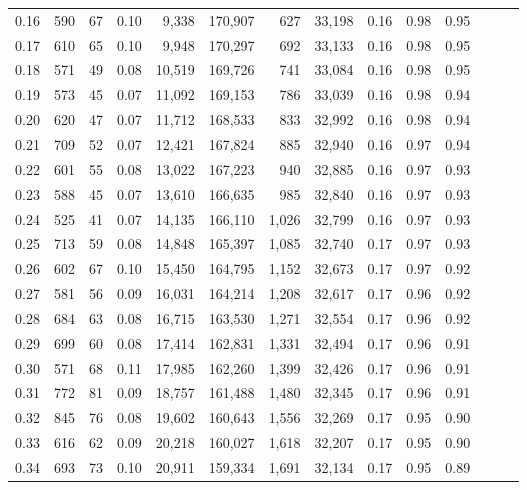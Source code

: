 \begin{tabular}{rrrrrrrrrrrrrr}
0.16 &    590 &     67 &  0.10 &    9,338 &  170,907 &     627 &  33,198 &  0.16 &  0.98 &      0.95 \\
0.17 &    610 &     65 &  0.10 &    9,948 &  170,297 &     692 &  33,133 &  0.16 &  0.98 &      0.95 \\
0.18 &    571 &     49 &  0.08 &   10,519 &  169,726 &     741 &  33,084 &  0.16 &  0.98 &      0.95 \\
0.19 &    573 &     45 &  0.07 &   11,092 &  169,153 &     786 &  33,039 &  0.16 &  0.98 &      0.94 \\
0.20 &    620 &     47 &  0.07 &   11,712 &  168,533 &     833 &  32,992 &  0.16 &  0.98 &      0.94 \\
0.21 &    709 &     52 &  0.07 &   12,421 &  167,824 &     885 &  32,940 &  0.16 &  0.97 &      0.94 \\
0.22 &    601 &     55 &  0.08 &   13,022 &  167,223 &     940 &  32,885 &  0.16 &  0.97 &      0.93 \\
0.23 &    588 &     45 &  0.07 &   13,610 &  166,635 &     985 &  32,840 &  0.16 &  0.97 &      0.93 \\
0.24 &    525 &     41 &  0.07 &   14,135 &  166,110 &   1,026 &  32,799 &  0.16 &  0.97 &      0.93 \\
0.25 &    713 &     59 &  0.08 &   14,848 &  165,397 &   1,085 &  32,740 &  0.17 &  0.97 &      0.93 \\
0.26 &    602 &     67 &  0.10 &   15,450 &  164,795 &   1,152 &  32,673 &  0.17 &  0.97 &      0.92 \\
0.27 &    581 &     56 &  0.09 &   16,031 &  164,214 &   1,208 &  32,617 &  0.17 &  0.96 &      0.92 \\
0.28 &    684 &     63 &  0.08 &   16,715 &  163,530 &   1,271 &  32,554 &  0.17 &  0.96 &      0.92 \\
0.29 &    699 &     60 &  0.08 &   17,414 &  162,831 &   1,331 &  32,494 &  0.17 &  0.96 &      0.91 \\
0.30 &    571 &     68 &  0.11 &   17,985 &  162,260 &   1,399 &  32,426 &  0.17 &  0.96 &      0.91 \\
0.31 &    772 &     81 &  0.09 &   18,757 &  161,488 &   1,480 &  32,345 &  0.17 &  0.96 &      0.91 \\
0.32 &    845 &     76 &  0.08 &   19,602 &  160,643 &   1,556 &  32,269 &  0.17 &  0.95 &      0.90 \\
0.33 &    616 &     62 &  0.09 &   20,218 &  160,027 &   1,618 &  32,207 &  0.17 &  0.95 &      0.90 \\
0.34 &    693 &     73 &  0.10 &   20,911 &  159,334 &   1,691 &  32,134 &  0.17 &  0.95 &      0.89 \\

\end{tabular}
